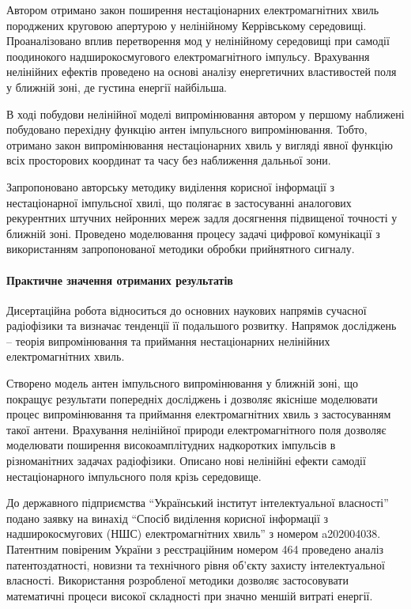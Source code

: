 Автором отримано закон поширення нестаціонарних електромагнітних хвиль 
породжених круговою апертурою у нелінійному Керрівському середовищі. 
Проаналізовано вплив перетворення мод у нелінійному середовищі
при самодії поодинокого надширокосмугового електромагнітного імпульсу. 
Врахування нелінійних ефектів проведено на основі аналізу енергетичних 
властивостей поля у ближній зоні, де густина енергії найбільша.

В ході побудови нелінійної моделі випромінювання автором у першому наближені 
побудовано перехідну функцію антен імпульсного випромінювання. Тобто, 
отримано закон випромінювання нестаціонарних хвиль у вигляді явної функцію 
всіх просторових координат та часу без наближення дальньої зони.

Запропоновано авторську методику виділення корисної інформації з 
нестаціонарної імпульсної хвилі, що полягає в застосуванні аналогових 
рекурентних штучних нейронних мереж задля досягнення підвищеної точності 
у ближній зоні. Проведено моделювання процесу задачі цифрової комунікації 
з використанням запропонованої методики обробки прийнятного сигналу.


\paragraph{Практичне значення отриманих результатів}

Дисертаційна робота відноситься до основних наукових напрямів сучасної 
радіофізики та визначає тенденції її подальшого розвитку. Напрямок
досліджень -- теорія випромінювання та приймання нестаціонарних 
нелінійних електромагнітних хвиль.

Створено модель антен імпульсного випромінювання у ближній зоні, що 
покращує результати попередніх досліджень і дозволяє якісніше моделювати 
процес випромінювання та приймання електромагнітних хвиль з застосуванням 
такої антени. Врахування нелінійної природи електромагнітного поля дозволяє
моделювати поширення високоамплітудних надкоротких імпульсів в різноманітних
задачах радіофізики. Описано нові нелінійні ефекти самодії нестаціонарного 
імпульсного поля крізь середовище.

До державного підприємства ``Український інститут інтелектуальної 
власності'' подано заявку на винахід ``Спосіб виділення корисної інформації 
з надширокосмугових (НШС) електромагнітних хвиль'' з номером a202004038.
Патентним повіреним України з реєстраційним номером 464 проведено 
аналіз патентоздатності, новизни та технічного рівня об'єкту захисту 
інтелектуальної власності. Використання розробленої методики дозволяє 
застосовувати математичні процеси високої складності при значно меншій 
витраті енергії. 

